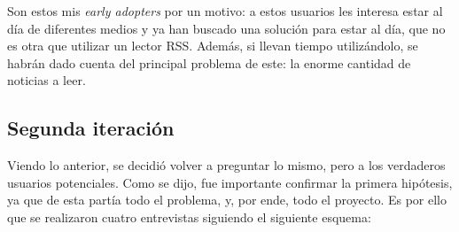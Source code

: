 Son estos mis \textit{early adopters} por un motivo: a estos usuarios les interesa estar al día de diferentes medios y ya han buscado una solución para estar al día, que no es otra que utilizar un lector RSS. Además, si llevan tiempo utilizándolo, se habrán dado cuenta del principal problema de este: la enorme cantidad de noticias a leer.


\subsection{Segunda iteración}

Viendo lo anterior, se decidió volver a preguntar lo mismo, pero a los verdaderos usuarios potenciales. Como se dijo, fue importante confirmar la primera hipótesis, ya que de esta partía todo el problema, y, por ende, todo el proyecto. Es por ello que se realizaron cuatro entrevistas siguiendo el siguiente esquema:


